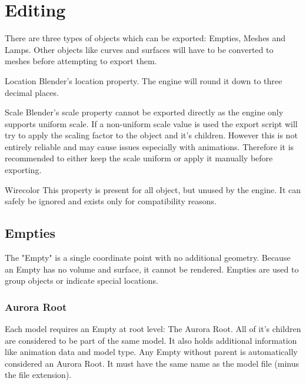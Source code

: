 \chapter{Editing}
There are three types of objects which can be exported: Empties,
Meshes and Lamps. Other objects like curves and surfaces will have to be
converted to meshes before attempting to export them.

\begin{propertyBlender}{Location}
    Blender's location property. The engine will round it down to three decimal places.
\end{propertyBlender} 

\begin{propertyBlender}{Scale}
    Blender's scale property cannot be exported directly as the engine 
    only supports uniform scale. If a non-uniform scale value is used the export 
    script will try to apply the scaling factor to the object and it's children.
    However this is not entirely reliable and may cause issues especially with 
    animations. Therefore it is recommended to either keep the scale uniform or 
    apply it manually before exporting.
\end{propertyBlender}  

\begin{propertyAurora}{Wirecolor}
    This property is present for all object, but unused by the engine. It can safely be ignored 
    and exists only for compatibility reasons.
\end{propertyAurora}


\section{Empties}
The "Empty" is a single coordinate point with no additional geometry. Because an Empty has 
no volume and surface, it cannot be rendered. Empties are used to group objects or indicate 
special locations.


\subsection{Aurora Root}
\begin{minipage}[t]{0.65\textwidth}
    Each model requires an Empty at root level: The Aurora Root. All of it's children are 
    considered to be part of the same model. It also holds additional information like animation data 
    and model type. Any Empty without parent is automatically considered an Aurora Root. 
    It must have the same name as the model file (minus the file extension). 
\end{minipage}\hfill
\begin{minipage}[t]{0.3\textwidth}
    \centering{}
    \label{fig1}
\end{minipage}


